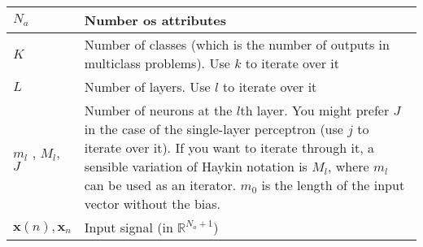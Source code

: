 \begin{xltabular}{\textwidth}{XX}
	\(N_a\)                                                                                                                                                                        & Number os attributes                                                                                                                                                                                                                                                                                                                   \\ \hline
	\(K\) \cite{bishopPatternRecognitionMachine2006}                                                                                                                               & Number of classes (which is the number of outputs in multiclass problems). Use \(k\) to iterate over it                                                                                                                                                                                                                                \\ \hline
	\(L\)                                                                                                                                                                          & Number of layers. Use \(l\) to iterate over it                                                                                                                                                                                                                                                                                         \\ \hline
	\(m_l\) \cite{bishopPatternRecognitionMachine2006}, \(M_l\), \(J\) \cite{bishopPatternRecognitionMachine2006}                                                                  & Number of neurons at the \(l\)th layer. You might prefer \(J\) in the case of the single-layer perceptron (use \(j\) to iterate over it). If you want to iterate through it, a sensible variation of Haykin notation is \(M_l\), where \(m_l\) can be used as an iterator. \(m_0\) is the length of the input vector without the bias. \\ \hline
	\(\mathbf{x}(n), \mathbf{x}_n\)                                                                                                                                                & Input signal (in \(\mathbb{R}^{N_a + 1}\))                                                                                                                                                                                                                                                                                             \\ \hline

\end{xltabular}

